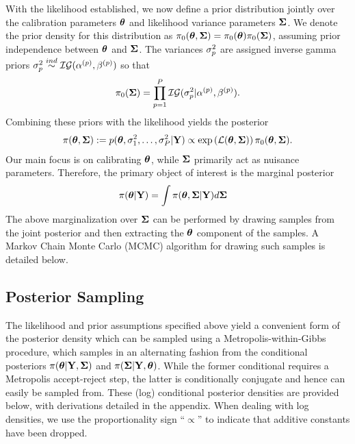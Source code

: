 \documentclass[12pt]{article}
\begin{document}
With the likelihood established, we now define a prior distribution jointly over the calibration parameters $\boldsymbol{\theta}$ and likelihood variance parameters $\boldsymbol{\Sigma}$. 
We denote the prior density for this distribution as $\pi_0(\boldsymbol{\theta}, \boldsymbol{\Sigma}) = \pi_0(\boldsymbol{\theta})\pi_0(\boldsymbol{\Sigma})$, assuming prior independence between $\boldsymbol{\theta}$ and $\boldsymbol{\Sigma}$.  
The variances $\sigma_{p}^2$ are assigned inverse gamma priors $\sigma_{p}^2 \overset{ind}{\sim} \mathcal{IG}({\alpha}^{(p)}, {\beta}^{(p)})$ so that 
\begin{align}
\pi_0(\boldsymbol{\Sigma}) = \prod_{p = 1}^{P} \mathcal{IG}(\sigma_{p}^2|{\alpha}^{(p)}, {\beta}^{(p)}). \label{inv_gamma_prior}
\end{align}
Combining these priors with the likelihood yields the posterior 
\begin{align}
\pi(\boldsymbol{\theta}, \boldsymbol{\Sigma}) := p(\boldsymbol{\theta}, \sigma_{1}^2, \dots, \sigma_{P}^2|\mathbf{Y}) \propto \exp\left(\mathcal{L}(\boldsymbol{\theta}, \boldsymbol{\Sigma})\right)\pi_0(\boldsymbol{\theta}, \boldsymbol{\Sigma}). \label{posterior_density}
\end{align}
Our main focus is on calibrating $\boldsymbol{\theta}$, while $\boldsymbol{\Sigma}$ primarily act as nuisance parameters. Therefore, the primary object of interest is the marginal posterior
\begin{align*}
\pi(\boldsymbol{\theta}|\mathbf{Y}) &= \int \pi(\boldsymbol{\theta}, \boldsymbol{\Sigma}|\mathbf{Y}) d\boldsymbol{\Sigma} 
\end{align*}
The above marginalization over $\boldsymbol{\Sigma}$ can be performed by drawing samples from the joint posterior and then extracting the $\boldsymbol{\theta}$ component of the samples. A 
Markov Chain Monte Carlo (MCMC) algorithm for drawing such samples is detailed below.  

\subsection{Posterior Sampling}
The likelihood and prior assumptions specified above yield a convenient form of the posterior density which can be sampled using a Metropolis-within-Gibbs procedure, which samples in an 
alternating fashion from the conditional posteriors $\pi(\boldsymbol{\theta}|\mathbf{Y}, \boldsymbol{\Sigma})$ and $\pi(\boldsymbol{\Sigma}|\mathbf{Y}, \boldsymbol{\theta})$. While the former conditional requires a Metropolis 
accept-reject step, the latter is conditionally conjugate and hence can easily be sampled from. These (log) conditional posterior densities are provided below, with derivations detailed in 
the appendix. When dealing with log densities, we use the proportionality sign ``$\propto$'' to indicate that additive constants have been dropped. 
\end{document}
